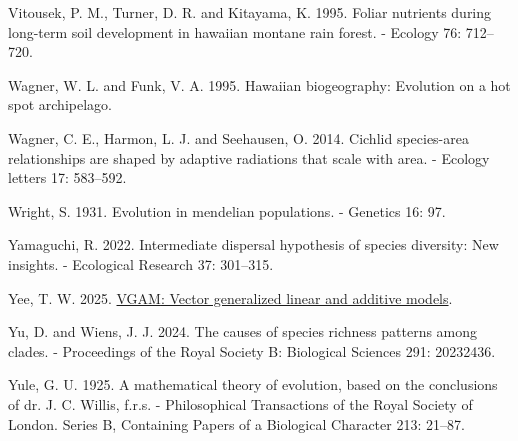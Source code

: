 \documentclass[
  letterpaper,
  DIV=11,
  numbers=noendperiod]{scrartcl}
\newlength{\cslhangindent}
\newenvironment{CSLReferences}[2] %
 {\begin{list}{}{%
  \setlength{\itemindent}{0pt}
  \setlength{\leftmargin}{0pt}
  \setlength{\parsep}{0pt}
  \ifodd #1
   \setlength{\leftmargin}{\cslhangindent}
   \setlength{\itemindent}{-1\cslhangindent}
  \fi
  \setlength{\itemsep}{#2\baselineskip}}}
 {\end{list}}
\begin{document}
\begin{CSLReferences}{1}{1}
Vitousek, P. M., Turner, D. R. and Kitayama, K. 1995. Foliar nutrients
during long-term soil development in hawaiian montane rain forest. -
Ecology 76: 712--720.

Wagner, W. L. and Funk, V. A. 1995. Hawaiian biogeography: Evolution on
a hot spot archipelago.

Wagner, C. E., Harmon, L. J. and Seehausen, O. 2014. Cichlid
species-area relationships are shaped by adaptive radiations that scale
with area. - Ecology letters 17: 583--592.

Wright, S. 1931. Evolution in mendelian populations. - Genetics 16: 97.

Yamaguchi, R. 2022. Intermediate dispersal hypothesis of species
diversity: New insights. - Ecological Research 37: 301--315.

Yee, T. W. 2025. \href{https://CRAN.R-project.org/package=VGAM}{{VGAM}:
Vector generalized linear and additive models}.

Yu, D. and Wiens, J. J. 2024. The causes of species richness patterns
among clades. - Proceedings of the Royal Society B: Biological Sciences
291: 20232436.

Yule, G. U. 1925. A mathematical theory of evolution, based on the
conclusions of dr. J. C. Willis, f.r.s. - Philosophical Transactions of
the Royal Society of London. Series B, Containing Papers of a Biological
Character 213: 21--87.

\end{CSLReferences}
\end{document}
